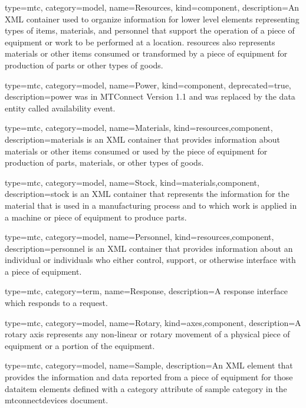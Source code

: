 {
  type=mtc,
  category=model,
  name={Resources},
  kind={component},
  description={An XML container used to organize information for \gls{lower level} elements representing types of items, materials, and personnel that support the operation of a piece of equipment or work to be performed at a location. \gls{resources} also represents materials or other items consumed or transformed by a piece of equipment for production of parts or other types of goods.}
}


{
  type=mtc,
  category=model,
  name={Power},
  kind={component},
  deprecated={true},
  description={\gls{power} was \DEPRECATED in MTConnect Version 1.1 and was replaced by the \gls{data entity} called \gls{availability event}.}
}


{
  type=mtc,
  category=model,
  name={Materials},
  kind={resources,component},
  description={\gls{materials} is an XML container that provides information about materials or other items consumed or used by the piece of equipment for production of parts, materials, or other types of goods.}
}


{
  type=mtc,
  category=model,
  name={Stock},
  kind={materials,component},
  description={\gls{stock} is an XML container that represents the information for the material that is used in a manufacturing process and to which work is applied in a machine or piece of equipment to produce parts.}
}


{
  type=mtc,
  category=model,
  name={Personnel},
  kind={resources,component},
  description={\gls{personnel} is an XML container that provides information about an individual or individuals who either control, support, or otherwise interface with a piece of equipment.
}
}


{
  type=mtc,
  category=term,
  name={Response},
  description={A response \gls{interface} which responds to a \gls{request}.}
}


{
  type=mtc,
  category=model,
  name={Rotary},
  kind={axes,component},
  description={A \gls{rotary} axis represents any non-linear or rotary movement of a physical piece of equipment or a portion of the equipment. }
}


{
  type=mtc,
  category=model,
  name={Sample},
  description={An XML element that provides the information and data reported from a piece of equipment for those \gls{dataitem} elements defined with a \gls{category} attribute of \gls{sample category} in the \gls{mtconnectdevices} document. }
}


